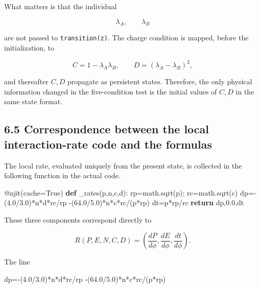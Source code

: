 \documentclass[
  a4paper,
]{article}
\newenvironment{Shaded}{}{}
\newcommand{\AttributeTok}[1]{\textcolor[rgb]{0.49,0.56,0.16}{#1}}
\newcommand{\ControlFlowTok}[1]{\textcolor[rgb]{0.00,0.44,0.13}{\textbf{#1}}}
\newcommand{\FloatTok}[1]{\textcolor[rgb]{0.25,0.63,0.44}{#1}}
\newcommand{\KeywordTok}[1]{\textcolor[rgb]{0.00,0.44,0.13}{\textbf{#1}}}
\newcommand{\NormalTok}[1]{#1}
\newcommand{\OperatorTok}[1]{\textcolor[rgb]{0.40,0.40,0.40}{#1}}
\newcommand{\VariableTok}[1]{\textcolor[rgb]{0.10,0.09,0.49}{#1}}
\begin{document}
What matters is that the individual

\[
\lambda_A,
\qquad
\lambda_B
\]

are not passed to \texttt{transition(z)}. The charge condition is
mapped, before the initialization, to

\[
C=1-\lambda_A\lambda_B,
\qquad
D=(\lambda_A-\lambda_B)^2,
\]

and thereafter \(C,D\) propagate as persistent states. Therefore, the
only physical information changed in the five-condition test is the
initial values of \(C,D\) in the same state format.

\subsection{6.5 Correspondence between the local interaction-rate code
and the
formulas}\label{correspondence-between-the-local-interaction-rate-code-and-the-formulas}

The local rate, evaluated uniquely from the present state, is collected
in the following function in the actual code.

\begin{Shaded}
\begin{Highlighting}[]
\AttributeTok{@njit}\NormalTok{(cache}\OperatorTok{=}\VariableTok{True}\NormalTok{)}
\KeywordTok{def}\NormalTok{ \_rates(p,n,c,d):}
\NormalTok{    rp}\OperatorTok{=}\NormalTok{math.sqrt(p)}\OperatorTok{;}\NormalTok{ rc}\OperatorTok{=}\NormalTok{math.sqrt(c)}
\NormalTok{    dp}\OperatorTok{={-}}\NormalTok{(}\FloatTok{4.0}\OperatorTok{/}\FloatTok{3.0}\NormalTok{)}\OperatorTok{*}\NormalTok{n}\OperatorTok{*}\NormalTok{d}\OperatorTok{*}\NormalTok{rc}\OperatorTok{/}\NormalTok{rp }\OperatorTok{{-}}\NormalTok{(}\FloatTok{64.0}\OperatorTok{/}\FloatTok{5.0}\NormalTok{)}\OperatorTok{*}\NormalTok{n}\OperatorTok{*}\NormalTok{c}\OperatorTok{*}\NormalTok{rc}\OperatorTok{/}\NormalTok{(p}\OperatorTok{*}\NormalTok{rp)}
\NormalTok{    dt}\OperatorTok{=}\NormalTok{p}\OperatorTok{*}\NormalTok{rp}\OperatorTok{/}\NormalTok{rc}
    \ControlFlowTok{return}\NormalTok{ dp,}\FloatTok{0.0}\NormalTok{,dt}
\end{Highlighting}
\end{Shaded}

These three components correspond directly to

\[
R(P,E,N,C,D)
=
\left(
\frac{dP}{d\phi},
\frac{dE}{d\phi},
\frac{dt}{d\phi}
\right).
\]

The line

\begin{Shaded}
\begin{Highlighting}[]
\NormalTok{dp}\OperatorTok{={-}}\NormalTok{(}\FloatTok{4.0}\OperatorTok{/}\FloatTok{3.0}\NormalTok{)}\OperatorTok{*}\NormalTok{n}\OperatorTok{*}\NormalTok{d}\OperatorTok{*}\NormalTok{rc}\OperatorTok{/}\NormalTok{rp }\OperatorTok{{-}}\NormalTok{(}\FloatTok{64.0}\OperatorTok{/}\FloatTok{5.0}\NormalTok{)}\OperatorTok{*}\NormalTok{n}\OperatorTok{*}\NormalTok{c}\OperatorTok{*}\NormalTok{rc}\OperatorTok{/}\NormalTok{(p}\OperatorTok{*}\NormalTok{rp)}
\end{Highlighting}
\end{Shaded}
\end{document}
